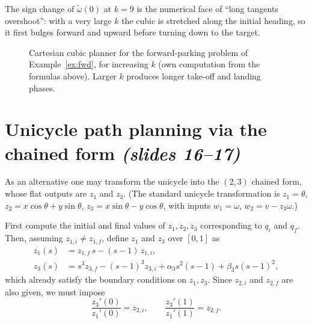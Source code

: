 \documentclass[11pt,a4paper]{article}
\def\boldsymbol#1{#1}%
\newcommand{\qi}{\boldsymbol{q}_i}
\newcommand{\qf}{\boldsymbol{q}_f}
\newcommand{\wt}{\tilde\omega}
\theoremstyle{definition}
\theoremstyle{plain}
\theoremstyle{remark}
\begin{document}
\begin{intuition}
The sign change of $\wt(0)$ at $k=9$ is the numerical face of ``long tangents overshoot'': with a very large $k$ the cubic is
stretched along the initial heading, so it first bulges forward and upward before turning down to the target.
\end{intuition}

\begin{figure}[h]
\centering
{}
\caption{Cartesian cubic planner for the forward-parking problem of Example~\ref{ex:fwd}, for increasing $k$
(own computation from the formulas above). Larger $k$ produces longer take-off and landing phases.}
\end{figure}

\section{Unicycle path planning via the chained form \emph{(slides 16--17)}}

As an alternative one may transform the unicycle into the $(2,3)$ chained form, whose flat outputs are $z_1$ and $z_3$.
(The standard unicycle transformation is $z_1=\theta$, $z_2=x\cos\theta+y\sin\theta$, $z_3=x\sin\theta-y\cos\theta$, with inputs
$w_1=\omega$, $w_2=v-z_3\omega$.)

First compute the initial and final values of $z_1,z_2,z_3$ corresponding to $\qi$ and $\qf$. Then, assuming
$z_{1,i}\ne z_{1,f}$, define $z_1$ and $z_3$ over $[0,1]$ as
\begin{align}
z_1(s)&=z_{1,f}\,s-(s-1)\,z_{1,i},\\
z_3(s)&=s^3z_{3,f}-(s-1)^3z_{3,i}+\alpha_3s^2(s-1)+\beta_3s(s-1)^2,
\end{align}
which already satisfy the boundary conditions on $z_1,z_3$. Since $z_{2,i}$ and $z_{2,f}$ are also given, we must impose
\begin{equation}
\frac{z_3'(0)}{z_1'(0)}=z_{2,i},\qquad \frac{z_3'(1)}{z_1'(1)}=z_{2,f}.
\end{equation}
\end{document}
